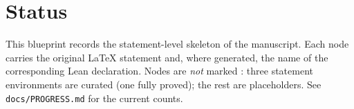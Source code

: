 \chapter*{Status}
This blueprint records the statement-level skeleton of the manuscript. Each node carries
the original LaTeX statement and, where generated, the name of the corresponding Lean
declaration. Nodes are \emph{not} marked \leanok: three statement environments are curated
(one fully proved); the rest are placeholders. See \texttt{docs/PROGRESS.md} for the current counts.

\tableofcontents












